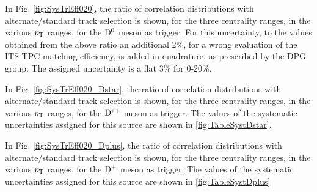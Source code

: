 In Fig. \ref{fig:SysTrEff020}, the ratio of correlation distributions with alternate/standard track selection is shown, for the three centrality ranges, in the various $p_{\rm T}$ ranges, for the ${\rm D^0}$ meson as trigger.
For this uncertainty, to the values obtained from the above ratio an additional 2\%, for a wrong evaluation of the ITS-TPC matching efficiency, is added in quadrature, as prescribed by the DPG group.
The assigned uncertainty is a flat 3\% for 0-20\%.

In Fig. \ref{fig:SysTrEff020_Dstar}, the ratio of correlation distributions with alternate/standard track selection is shown, for the three centrality ranges, in the various $p_{\rm T}$ ranges, for the ${\rm D^{*+}}$ meson as trigger. The values of the systematic uncertainties assigned for this source are shown in \ref{fig:TableSystDstar}.

In Fig. \ref{fig:SysTrEff020_Dplus}, the ratio of correlation distributions with alternate/standard track selection is shown, for the three centrality ranges, in the various $p_{\rm T}$ ranges, for the ${\rm D^+}$ meson as trigger.
The values of the systematic uncertainties assigned for this source are shown in \ref{fig:TableSystDplus}


